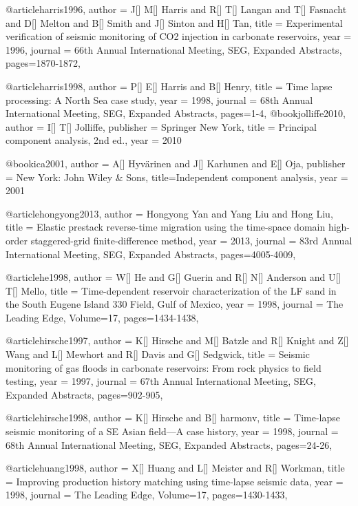 @article{harris1996,
  author =	 {J[] M[] Harris and R[] T[] Langan and T[] Fasnacht and D[] Melton and B[] Smith and J[] Sinton and H[] Tan},
  title =	 {Experimental verification of seismic monitoring of CO2 injection in carbonate reservoirs},
  year =	 1996,
  journal =	 {66th Annual International Meeting, SEG, Expanded Abstracts},
 pages=1870-1872,
}

@article{harris1998,
  author =	 {P[] E[] Harris and B[] Henry},
  title =	 {Time lapse processing: A North Sea case study},
  year =	 1998,
  journal =	 {68th Annual International Meeting, SEG, Expanded Abstracts},
 pages=1-4,
}
@book{jolliffe2010,
   author =       {I[] T[] Jolliffe},
   publisher =    {Springer New York},
   title =        {Principal component analysis, 2nd ed.},
   year =         {2010}
}

@book{ica2001,
   author =       {A[] Hyv\"{a}rinen  and J[] Karhunen and E[] Oja},
   publisher =    {New York: John Wiley \& Sons},
   title={Independent component analysis},
   year =         {2001}
}


@article{hongyong2013,
  author =	 {Hongyong Yan and Yang Liu and Hong Liu},
  title =	 {Elastic prestack reverse-time migration using the time-space domain high-order staggered-grid finite-difference method},
  year =	 2013,
  journal =	 {83rd Annual International Meeting, SEG, Expanded Abstracts},
 pages=4005-4009,
}

@article{he1998,
  author =	 {W[] He and G[] Guerin and R[] N[] Anderson and U[] T[] Mello},
  title =	 {Time-dependent reservoir characterization of the LF sand in the South Eugene Island 330 Field, Gulf of Mexico},
  year =	 1998,
  journal =	 {The Leading Edge},
    Volume=17,
 pages=1434-1438,
}

@article{hirsche1997,
  author =	 {K[] Hirsche and M[] Batzle and R[] Knight and Z[] Wang and L[] Mewhort and R[] Davis and G[] Sedgwick},
  title =	 {Seismic monitoring of gas floods in carbonate reservoirs: From rock physics to field testing},
  year =	 1997,
  journal =	 {67th Annual International Meeting, SEG, Expanded Abstracts},
 pages=902-905,
}

@article{hirsche1998,
  author =	 {K[] Hirsche and B[] harmonv},
  title =	 {Time-lapse seismic monitoring of a SE Asian field—A case history},
  year =	 1998,
  journal =	 {68th Annual International Meeting, SEG, Expanded Abstracts},
 pages=24-26,
}

@article{huang1998,
  author =	 {X[] Huang and L[] Meister and R[] Workman},
  title =	 {Improving production history matching using time-lapse seismic data},
  year =	 1998,
  journal =	 {The Leading Edge},
    Volume=17,
 pages=1430-1433,
}

